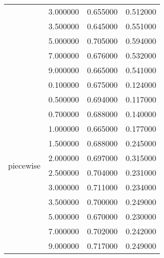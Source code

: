 \begin{tabular}{llrr}
 & 3.000000 & 0.655000 & 0.512000 \\
 & 3.500000 & 0.645000 & 0.551000 \\
 & 5.000000 & 0.705000 & 0.594000 \\
 & 7.000000 & 0.676000 & 0.532000 \\
 & 9.000000 & 0.665000 & 0.541000 \\
\cline{1-4}
\multirow[t]{12}{*}{piecewise} & 0.100000 & 0.675000 & 0.124000 \\
 & 0.500000 & 0.694000 & 0.117000 \\
 & 0.700000 & 0.688000 & 0.140000 \\
 & 1.000000 & 0.665000 & 0.177000 \\
 & 1.500000 & 0.688000 & 0.245000 \\
 & 2.000000 & 0.697000 & 0.315000 \\
 & 2.500000 & 0.704000 & 0.231000 \\
 & 3.000000 & 0.711000 & 0.234000 \\
 & 3.500000 & 0.700000 & 0.249000 \\
 & 5.000000 & 0.670000 & 0.230000 \\
 & 7.000000 & 0.702000 & 0.242000 \\
 & 9.000000 & 0.717000 & 0.249000 \\
\cline{1-4}
\bottomrule
\end{tabular}
